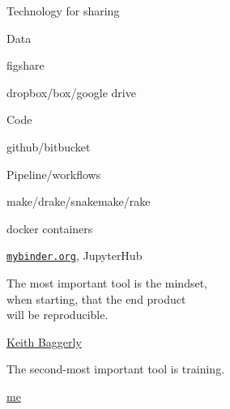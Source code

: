 \documentclass[aspectratio=169,12pt,t]{beamer}
\begin{document}
\begin{frame}[c]{Technology for sharing}

  \bbi
\item Data
  \bi
\item figshare
\item dropbox/box/google drive
  \ei
\item Code
  \bi
\item github/bitbucket
  \ei
\item Pipeline/workflows
  \bi
\item make/drake/snakemake/rake
\item docker containers
\item \href{https://mybinder.org}{\tt mybinder.org}, JupyterHub
  \ei
  \ei

\end{frame}




\begin{frame}[c]{}

\begin{center}
\large
The most important tool is the {\hilit mindset},\\
when starting, that the end product \\
will be reproducible.
\end{center}

\hfill
{\lolit
{\textendash} \href{https://odin.mdacc.tmc.edu/~kabaggerly/}{Keith Baggerly}
}

\end{frame}




\begin{frame}[c]{}

\begin{center}
\large
The second-most important tool is training.
\end{center}

\vspace*{12mm}

\hfill
{\lolit
{\textendash} \href{https://kbroman.org}{me} \hspace*{20mm}
}

\note{
}
\end{frame}
\end{document}
